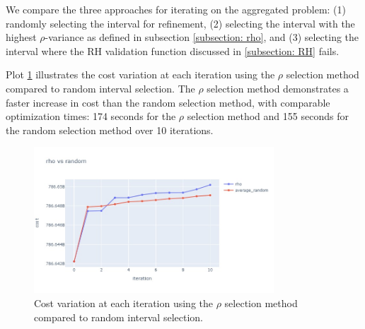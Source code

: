 \documentclass[smallextended,natbib]{svjour3}       %
\numberwithin{theorem}{section}
\begin{document}



We compare the three approaches for iterating on the aggregated problem: 
(1) randomly selecting the interval for refinement, 
 (2) selecting the interval with the highest \(\rho\)-variance as defined in subsection \ref{subsection: rho}, and 
 (3) selecting the interval where the RH validation function discussed in \ref{subsection: RH} fails. 

Plot \ref{fig:rho_vs_average} illustrates the cost variation at each iteration using the \(\rho\) selection method compared to random interval selection.
 The \(\rho\) selection method demonstrates a faster increase in cost than the random selection method, with comparable optimization times: 174 seconds for the \(\rho\) selection method 
 and 155 seconds for the random selection method over 10 iterations.

 \begin{figure}[htbp]
  \centering
  \includegraphics[width=0.8\textwidth]{images/rho_vas_average2.png}
  \caption{Cost variation at each iteration using the \(\rho\) selection method compared to random interval selection.}
  \label{fig:rho_vs_average}
\end{figure}
\end{document}

